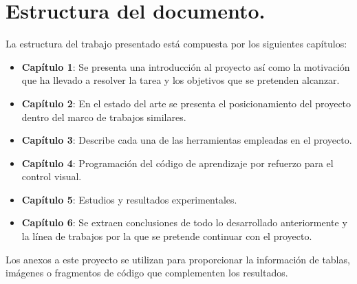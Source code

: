 \section{Estructura del documento.}\label{estructura_documento}

La estructura del trabajo presentado está compuesta por los siguientes capítulos:\\

\begin{itemize}
    \item \textbf{Capítulo 1}: Se presenta una introducción al proyecto así como la motivación que ha llevado a resolver la tarea y los objetivos que se pretenden alcanzar.\\
    \item \textbf{Capítulo 2}: En el estado del arte se presenta el posicionamiento del proyecto dentro del marco de trabajos similares.\\
    \item \textbf{Capítulo 3}: Describe cada una de las herramientas empleadas en el proyecto.\\
    \item \textbf{Capítulo 4}: Programación del código de aprendizaje por refuerzo para el control visual.\\
    \item \textbf{Capítulo 5}: Estudios y resultados experimentales.\\
    \item \textbf{Capítulo 6}: Se extraen conclusiones de todo lo desarrollado anteriormente y la línea de trabajos por la que se pretende continuar con el proyecto.\\
\end{itemize}

\noindent
Los anexos a este proyecto se utilizan para proporcionar la información de tablas, imágenes o fragmentos de código que complementen los resultados.
